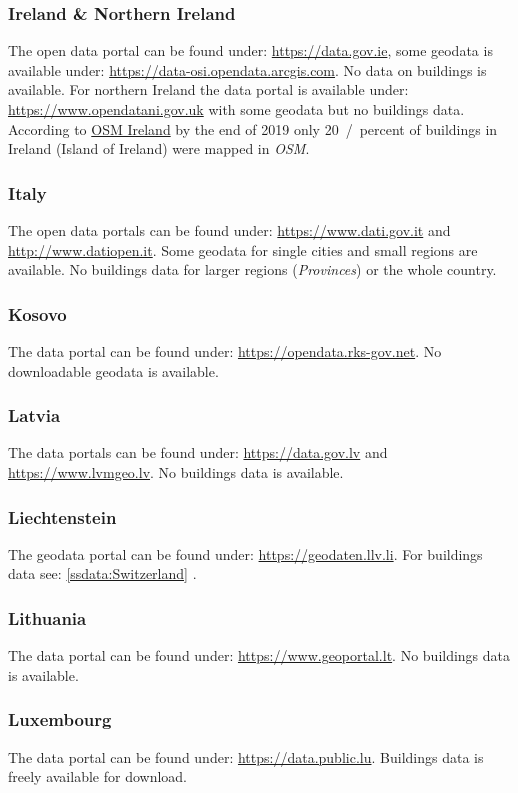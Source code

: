 \documentclass[final, 3p, times, 12pt]{elsarticle} %
\begin{document}
\subsubsection{Ireland \& Northern Ireland}
The open data portal can be found under: \url{https://data.gov.ie}, some geodata is available under: \url{https://data-osi.opendata.arcgis.com}. No data on buildings is available. For northern Ireland the data portal is available under: \url{https://www.opendatani.gov.uk} with some geodata but no buildings data. According to \href{https://tasks.openstreetmap.ie/about}{OSM Ireland} by the end of 2019 only \SI{20}{/percent} of buildings in Ireland (Island of Ireland) were mapped in \emph{OSM}.
\subsubsection{Italy}
The open data portals can be found under: \url{https://www.dati.gov.it} and \url{http://www.datiopen.it}. Some geodata for single cities and small regions are available. No buildings data for larger regions (\emph{Provinces}) or the whole country.
\subsubsection{Kosovo}
The data portal can be found under: \url{https://opendata.rks-gov.net}. No downloadable geodata is available.
\subsubsection{Latvia}
The data portals can be found under: \url{https://data.gov.lv} and \url{https://www.lvmgeo.lv}. No buildings data is available.
\subsubsection{Liechtenstein}
The geodata portal can be found under: \url{https://geodaten.llv.li}. For buildings data see: \ref{ssdata:Switzerland} .
\subsubsection{Lithuania}
The data portal can be found under: \url{https://www.geoportal.lt}. No buildings data is available.
\subsubsection{Luxembourg}
The data portal can be found under: \url{https://data.public.lu}. Buildings data is freely available for download.
\end{document}
